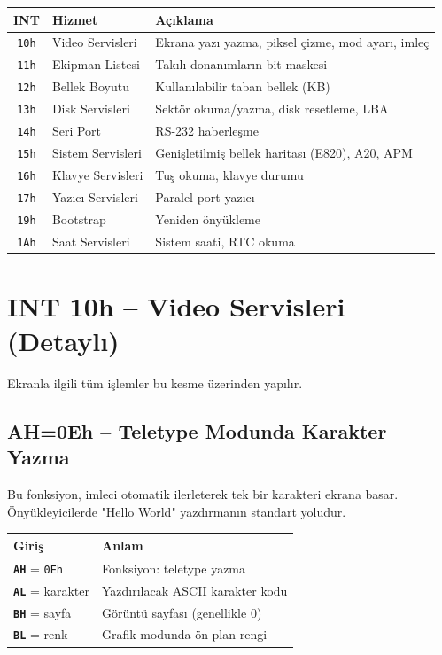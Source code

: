 \documentclass[11pt,a4paper]{article}
\newcommand{\reg}[1]{\texttt{\color{anaMavi}\textbf{#1}}}
\newcommand{\hx}[1]{\texttt{\color{turuncu}#1}}
\begin{document}
\begin{center}
\begin{tabularx}{\textwidth}{@{}c l >{\raggedright\arraybackslash}X@{}}
\toprule
\rowcolor{anaMavi}
\color{white}\textbf{INT} & \color{white}\textbf{Hizmet} & \color{white}\textbf{Açıklama} \\
\midrule
\hx{10h} & Video Servisleri & Ekrana yazı yazma, piksel çizme, mod ayarı, imleç \\
\rowcolor{acikGri} \hx{11h} & Ekipman Listesi & Takılı donanımların bit maskesi \\
\hx{12h} & Bellek Boyutu & Kullanılabilir taban bellek (KB) \\
\rowcolor{acikGri} \hx{13h} & Disk Servisleri & Sektör okuma/yazma, disk resetleme, LBA \\
\hx{14h} & Seri Port & RS-232 haberleşme \\
\rowcolor{acikGri} \hx{15h} & Sistem Servisleri & Genişletilmiş bellek haritası (E820), A20, APM \\
\hx{16h} & Klavye Servisleri & Tuş okuma, klavye durumu \\
\rowcolor{acikGri} \hx{17h} & Yazıcı Servisleri & Paralel port yazıcı \\
\hx{19h} & Bootstrap & Yeniden önyükleme \\
\rowcolor{acikGri} \hx{1Ah} & Saat Servisleri & Sistem saati, RTC okuma \\
\bottomrule
\end{tabularx}
\end{center}

\section{INT 10h -- Video Servisleri (Detaylı)}

Ekranla ilgili tüm işlemler bu kesme üzerinden yapılır.

\subsection{AH=0Eh -- Teletype Modunda Karakter Yazma}

Bu fonksiyon, imleci otomatik ilerleterek tek bir karakteri ekrana basar.
Önyükleyicilerde "Hello World" yazdırmanın standart yoludur.

\begin{center}
\begin{tabularx}{\textwidth}{@{}l >{\raggedright\arraybackslash}X@{}}
\toprule
\rowcolor{acikMavi}\color{anaMavi}\textbf{Giriş} & \color{anaMavi}\textbf{Anlam} \\
\midrule
\reg{AH} = \hx{0Eh} & Fonksiyon: teletype yazma \\
\reg{AL} = karakter & Yazdırılacak ASCII karakter kodu \\
\reg{BH} = sayfa & Görüntü sayfası (genellikle 0) \\
\reg{BL} = renk & Grafik modunda ön plan rengi \\
\bottomrule
\end{tabularx}
\end{center}
\end{document}
